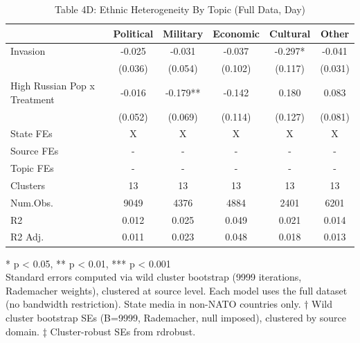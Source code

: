 \begin{table}[!t]
\caption{Table 4D: Ethnic Heterogeneity By Topic (Full Data, Day)} 
\fontsize{12.0pt}{14.4pt}\selectfont
\begin{tabular*}{\linewidth}{@{\extracolsep{\fill}}lccccc}
\toprule
  & Political & Military & Economic & Cultural & Other \\ 
\midrule\addlinespace[2.5pt]
Invasion & -0.025 & -0.031 & -0.037 & -0.297* & -0.041 \\ 
 & (0.036) & (0.054) & (0.102) & (0.117) & (0.031) \\ 
High Russian Pop x Treatment & -0.016 & -0.179** & -0.142 & 0.180 & 0.083 \\ 
{} & {(0.052)} & {(0.069)} & {(0.114)} & {(0.127)} & {(0.081)} \\ 
State FEs & X & X & X & X & X \\ 
Source FEs & - & - & - & - & - \\ 
Topic FEs & - & - & - & - & - \\ 
Clusters & 13 & 13 & 13 & 13 & 13 \\ 
Num.Obs. & 9049 & 4376 & 4884 & 2401 & 6201 \\ 
R2 & 0.012 & 0.025 & 0.049 & 0.021 & 0.014 \\ 
R2 Adj. & 0.011 & 0.023 & 0.048 & 0.018 & 0.013 \\ 
\bottomrule
\end{tabular*}
\begin{minipage}{\linewidth}
* p < 0.05, ** p < 0.01, *** p < 0.001\\
Standard errors computed via wild cluster bootstrap (9999 iterations, Rademacher
weights), clustered at source level. Each model uses the full dataset (no
bandwidth restriction). State media in non-NATO countries only. † Wild cluster
bootstrap SEs (B=9999, Rademacher, null imposed), clustered by source domain. ‡
Cluster-robust SEs from rdrobust.\\
\end{minipage}
\end{table}

